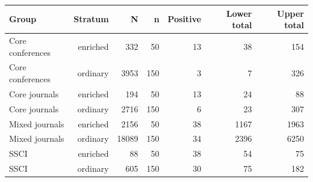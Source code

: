 \begin{tabular}{@{}lrrrrrr@{}}
\toprule
Group & Stratum & N & n & Positive & Lower total & Upper total \\
\midrule
Core conferences & enriched & 332 & 50 & 13 & 38 & 154 \\
Core conferences & ordinary & 3953 & 150 & 3 & 7 & 326 \\
Core journals & enriched & 194 & 50 & 13 & 24 & 88 \\
Core journals & ordinary & 2716 & 150 & 6 & 23 & 307 \\
Mixed journals & enriched & 2156 & 50 & 38 & 1167 & 1963 \\
Mixed journals & ordinary & 18089 & 150 & 34 & 2396 & 6250 \\
SSCI & enriched & 88 & 50 & 38 & 54 & 75 \\
SSCI & ordinary & 605 & 150 & 30 & 75 & 182 \\
\bottomrule
\end{tabular}
